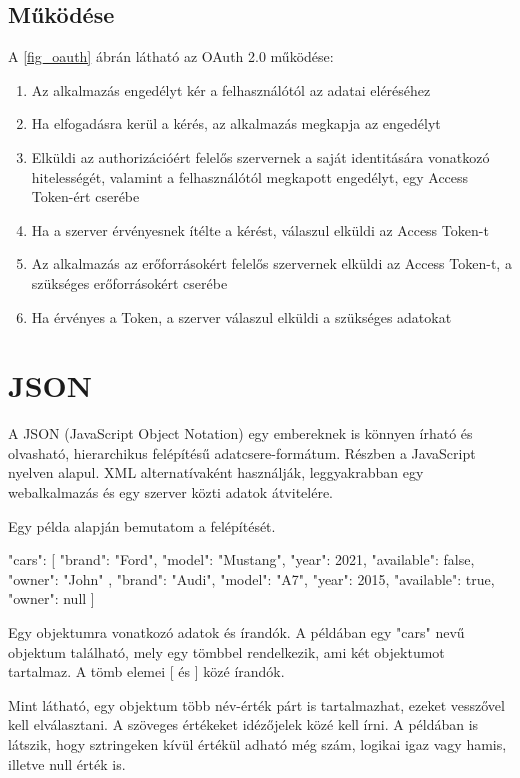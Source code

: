 \subsection*{Működése} 

A \ref{fig_oauth} ábrán látható az OAuth 2.0 működése: 



\begin{enumerate}
\item Az alkalmazás engedélyt kér a felhasználótól az adatai eléréséhez 
\item Ha elfogadásra kerül a kérés, az alkalmazás megkapja az engedélyt 
\item Elküldi az authorizációért felelős szervernek a saját identitására vonatkozó hitelességét, valamint a felhasználótól megkapott engedélyt, egy Access Token-ért cserébe 
\item Ha a szerver érvényesnek ítélte a kérést, válaszul elküldi az Access Token-t 
\item Az alkalmazás az erőforrásokért felelős szervernek elküldi az Access Token-t, a szükséges erőforrásokért cserébe 
\item Ha érvényes a Token, a szerver válaszul elküldi a szükséges adatokat 
\end{enumerate}


\section{JSON}

A JSON (JavaScript Object Notation) egy embereknek is könnyen írható és olvasható, hierarchikus felépítésű adatcsere-formátum.
Részben a JavaScript nyelven alapul.
XML alternatívaként használják, leggyakrabban egy webalkalmazás és egy szerver közti adatok átvitelére. 

Egy példa alapján bemutatom a felépítését. 

{"cars": [{ 
"brand": "Ford", 
"model": "Mustang", 
"year": 2021, 
"available": false, 
"owner": "John" 
        }, { 
"brand": "Audi", 
"model": "A7", 
"year": 2015, 
"available": true, 
"owner": null 
        } 
]} 

Egy objektumra vonatkozó adatok { és } írandók.
A példában egy "cars" nevű objektum található, mely egy tömbbel rendelkezik, ami két objektumot tartalmaz.
A tömb elemei [ és ] közé írandók.

Mint látható, egy objektum több név-érték párt is tartalmazhat, ezeket vesszővel kell elválasztani.
A szöveges értékeket idézőjelek közé kell írni.
A példában is látszik, hogy sztringeken kívül értékül adható még szám, logikai igaz vagy hamis, illetve null érték is. 

